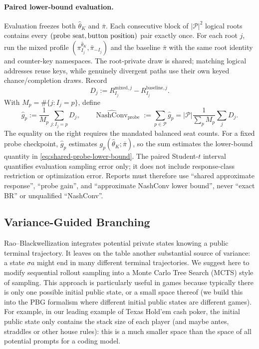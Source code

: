 \documentclass[12pt, a4paper]{article}
\begin{document}
\paragraph{Paired lower-bound evaluation.}
Evaluation freezes both $\widehat\theta_K$ and $\bar\pi$.  Each consecutive
block of $|\mathcal P|^2$ logical roots contains every
$(\textnormal{probe seat},\textnormal{button position})$ pair exactly once.
For each root $j$, run the mixed profile
$(\pi_{I_j}^{\widehat\theta_K},\bar\pi_{-I_j})$ and the baseline $\bar\pi$
with the same root identity and counter-key namespaces.  The root-private draw
is shared; matching logical addresses reuse keys, while genuinely divergent
paths use their own keyed chance/completion draws.  Record
\begin{equation}\label{eq:paired-probe-difference}
  D_j:=R_{I_j}^{\mathrm{mixed},j}-R_{I_j}^{\mathrm{baseline},j}.
\end{equation}
With $M_p=\#\{j:I_j=p\}$, define
\begin{equation}\label{eq:approximate-nashconv-estimator}
  \widehat g_p:=\frac1{M_p}\sum_{j:I_j=p}D_j,
  \qquad
  \widehat{\operatorname{NashConv}}_{\mathrm{probe}}
  :=\sum_{p\in\mathcal P}\widehat g_p
  =|\mathcal P|\frac1{\sum_pM_p}\sum_jD_j.
\end{equation}
The equality on the right requires the mandated balanced seat counts.  For a
fixed probe checkpoint, $\widehat g_p$ estimates
$g_p(\widehat\theta_K;\bar\pi)$, so the sum estimates the lower-bound quantity
in \autoref{eq:shared-probe-lower-bound}.  The paired Student-$t$ interval
quantifies evaluation sampling error only; it does not include response-class
restriction or optimization error.  Reports must therefore use
``shared approximate response'', ``probe gain'', and ``approximate NashConv
lower bound'', never ``exact BR'' or unqualified ``NashConv''.

\subsection{Variance-Guided Branching}\label{subsec:variance-guided-branching}

Rao--Blackwellization integrates potential private states knowing a public terminal trajectory.
It leaves on the table another substantial source of variance: a state $\sigma a$ might end in many different terminal trajectories.
We suggest here to modify sequential rollout sampling into a Monte Carlo Tree Search (MCTS) style of sampling.
This approach is particularly useful in games because typically there is only one possible initial public state, or a small space thereof (we build this into the PBG formalism where different initial public states are different games).
For example, in our leading example of Texas Hold'em cash poker, the initial public state only contains the stack size of each player (and maybe antes, straddles or other house rules): this is a much smaller space than the space of all potential prompts for a coding model.
\end{document}
